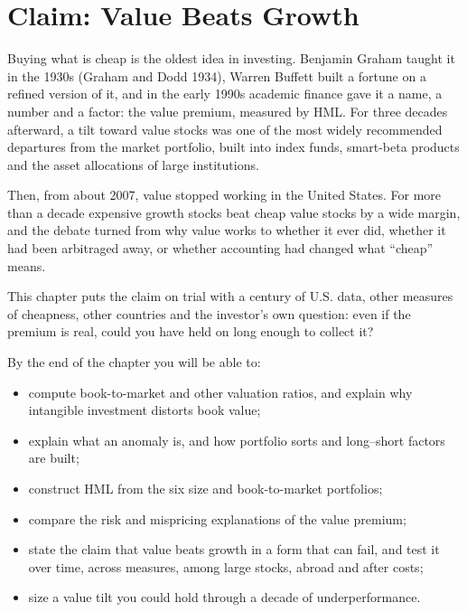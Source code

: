 \makeatletter
{}
\makeatother

\chapter{Claim: Value Beats Growth}
\label{ch:08}

Buying what is cheap is the oldest idea in investing. Benjamin Graham taught it in the 1930s (Graham and Dodd 1934), Warren Buffett built a fortune on a refined version of it, and in the early 1990s academic finance gave it a name, a number and a factor: the value premium, measured by HML. For three decades afterward, a tilt toward value stocks was one of the most widely recommended departures from the market portfolio, built into index funds, smart-beta products and the asset allocations of large institutions.

Then, from about 2007, value stopped working in the United States. For more than a decade expensive growth stocks beat cheap value stocks by a wide margin, and the debate turned from why value works to whether it ever did, whether it had been arbitraged away, or whether accounting had changed what ``cheap'' means.

This chapter puts the claim on trial with a century of U.S. data, other measures of cheapness, other countries and the investor's own question: even if the premium is real, could you have held on long enough to collect it?

By the end of the chapter you will be able to:

\begin{itemize}
  \item compute book-to-market and other valuation ratios, and explain why intangible investment distorts book value;
  \item explain what an anomaly is, and how portfolio sorts and long--short factors are built;
  \item construct HML from the six size and book-to-market portfolios;
  \item compare the risk and mispricing explanations of the value premium;
  \item state the claim that value beats growth in a form that can fail, and test it over time, across measures, among large stocks, abroad and after costs;
  \item size a value tilt you could hold through a decade of underperformance.
\end{itemize}

